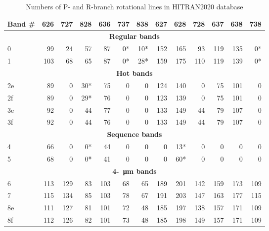 \begin{table}
\caption{Numbers of P- and R-branch rotational lines in HITRAN2020 database}
\label{table:HITRAN}
\centering
\begin{tabular}{lrrrrrrrrrrrr}
\hline 
Band \# & 626 & 727 & 828 & 636 & 737 & 838 & 627 & 628 & 728 & 637 & 638 & 738 \\
\hline 
\multicolumn{13}{c}{\textbf{Regular bands}}                                     \\
0       & 99  & 24  & 57  & 87  & 0*  & 10* & 152 & 165 & 93  & 119 & 135 & 0*  \\
1       & 103 & 68  & 65  & 87  & 0*  & 28* & 159 & 175 & 110 & 119 & 139 & 0*  \\
\multicolumn{13}{c}{\textbf{Hot bands}}                                         \\
2e      & 89  & 0   & 30* & 75  & 0   & 0   & 124 & 140 & 0   & 75  & 101 & 0   \\
2f      & 89  & 0   & 29* & 76  & 0   & 0   & 123 & 139 & 0   & 75  & 101 & 0   \\
3e      & 92  & 0   & 44  & 77  & 0   & 0   & 133 & 149 & 44  & 79  & 107 & 0   \\
3f      & 92  & 0   & 44  & 76  & 0   & 0   & 133 & 149 & 44  & 79  & 107 & 0   \\
\multicolumn{13}{c}{\textbf{Sequence bands}}                                    \\
4       & 66  & 0   & 0*  & 44  & 0   & 0   & 0   & 13* & 0   & 0   & 0   & 0   \\
5       & 68  & 0   & 0*  & 41  & 0   & 0   & 0   & 60* & 0   & 0   & 0   & 0   \\
\multicolumn{13}{c}{\textbf{4-\SI{}{\micro\meter} bands}}                       \\
6       & 113 & 129 & 83  & 103 & 68  & 65  & 189 & 201 & 142 & 159 & 173 & 109 \\
7       & 115 & 134 & 85  & 103 & 78  & 67  & 191 & 203 & 147 & 163 & 177 & 115 \\
8e      & 111 & 127 & 81  & 101 & 72  & 48  & 185 & 197 & 138 & 157 & 171 & 109 \\
8f      & 112 & 126 & 82  & 101 & 73  & 48  & 185 & 198 & 149 & 157 & 171 & 109 \\
\hline 
\end{tabular}
\end{table}

